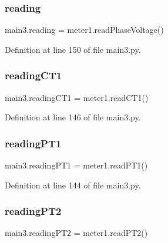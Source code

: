 \mbox{\label{namespacemain3_a34f71711d9f071c11a4574c8d3cef88d}} 
\subsubsection{\texorpdfstring{reading}{reading}}
{\footnotesize\ttfamily main3.\+reading = meter1.\+read\+Phase\+Voltage()}



Definition at line 150 of file main3.\+py.

\mbox{\label{namespacemain3_ad4596b47de04ad652b165f8a319cc003}} 
\subsubsection{\texorpdfstring{reading\+C\+T1}{readingCT1}}
{\footnotesize\ttfamily main3.\+reading\+C\+T1 = meter1.\+read\+C\+T1()}



Definition at line 146 of file main3.\+py.

\mbox{\label{namespacemain3_a66971b3af77d619b5249162539add371}} 
\subsubsection{\texorpdfstring{reading\+P\+T1}{readingPT1}}
{\footnotesize\ttfamily main3.\+reading\+P\+T1 = meter1.\+read\+P\+T1()}



Definition at line 144 of file main3.\+py.

\mbox{\label{namespacemain3_a77f2179ee84347784f243bf150c0e373}} 
\subsubsection{\texorpdfstring{reading\+P\+T2}{readingPT2}}
{\footnotesize\ttfamily main3.\+reading\+P\+T2 = meter1.\+read\+P\+T2()}



